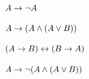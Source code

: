 \begin{compactlist}
\item  $A \rightarrow \neg A$ \vspace{.5ex}

%
\item $A \rightarrow (A \wedge (A \vee B))$ \vspace{.5ex}

%

\item $(A \rightarrow B) \leftrightarrow (B \rightarrow A)$ 	\vspace{.5ex}				%
%
%
%

\item $A \rightarrow \neg(A \wedge (A \vee B)) $	\vspace{.5ex}

%
%
%


\end{compactlist}
